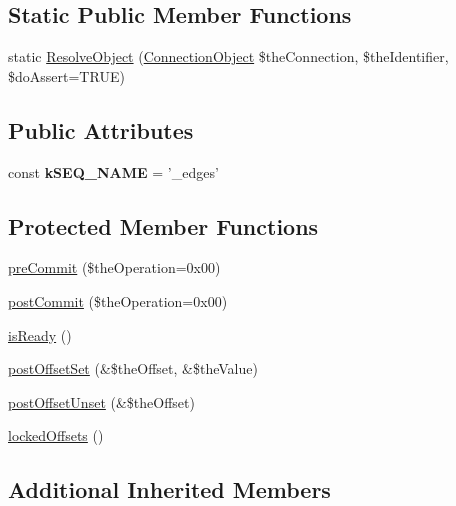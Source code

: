 \subsection*{Static Public Member Functions}
\begin{DoxyCompactItemize}
\item 
static \hyperlink{class_ontology_wrapper_1_1_edge_a159dd13efea0442efae114c0903a3aeb}{Resolve\-Object} (\hyperlink{class_ontology_wrapper_1_1_connection_object}{Connection\-Object} \$the\-Connection, \$the\-Identifier, \$do\-Assert=T\-R\-U\-E)
\end{DoxyCompactItemize}
\subsection*{Public Attributes}
\begin{DoxyCompactItemize}
\item 
\hypertarget{class_ontology_wrapper_1_1_edge_af0a68ad0c816d7efde12dc4962ffa039}{const {\bfseries k\-S\-E\-Q\-\_\-\-N\-A\-M\-E} = '\-\_\-edges'}\label{class_ontology_wrapper_1_1_edge_af0a68ad0c816d7efde12dc4962ffa039}

\end{DoxyCompactItemize}
\subsection*{Protected Member Functions}
\begin{DoxyCompactItemize}
\item 
\hyperlink{class_ontology_wrapper_1_1_edge_a4b216757f6012073e6532e8f9d9d0af9}{pre\-Commit} (\$the\-Operation=0x00)
\item 
\hyperlink{class_ontology_wrapper_1_1_edge_a1eda20b86f5bad5901332a61b2a2373c}{post\-Commit} (\$the\-Operation=0x00)
\item 
\hyperlink{class_ontology_wrapper_1_1_edge_a15832a03eb158f3c1ed72bf0aeee7686}{is\-Ready} ()
\item 
\hyperlink{class_ontology_wrapper_1_1_edge_a4a58b988123053bffe0dc3cab828d471}{post\-Offset\-Set} (\&\$the\-Offset, \&\$the\-Value)
\item 
\hyperlink{class_ontology_wrapper_1_1_edge_a16c9a301e4cd9db2ad89526abc7fde23}{post\-Offset\-Unset} (\&\$the\-Offset)
\item 
\hyperlink{class_ontology_wrapper_1_1_edge_a4ebc54fd09b9565562da5dcbd2012edb}{locked\-Offsets} ()
\end{DoxyCompactItemize}
\subsection*{Additional Inherited Members}


